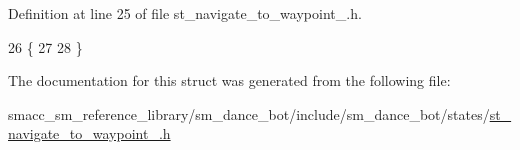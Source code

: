 Definition at line 25 of file st\+\_\+navigate\+\_\+to\+\_\+waypoint\+\_.\+h.


\begin{DoxyCode}
26   \{
27     
28   \}
\end{DoxyCode}


The documentation for this struct was generated from the following file\+:\begin{DoxyCompactItemize}
\item 
smacc\+\_\+sm\+\_\+reference\+\_\+library/sm\+\_\+dance\+\_\+bot/include/sm\+\_\+dance\+\_\+bot/states/\hyperlink{st__navigate__to__waypoint__1_8h}{st\+\_\+navigate\+\_\+to\+\_\+waypoint\+\_.\+h}\end{DoxyCompactItemize}
